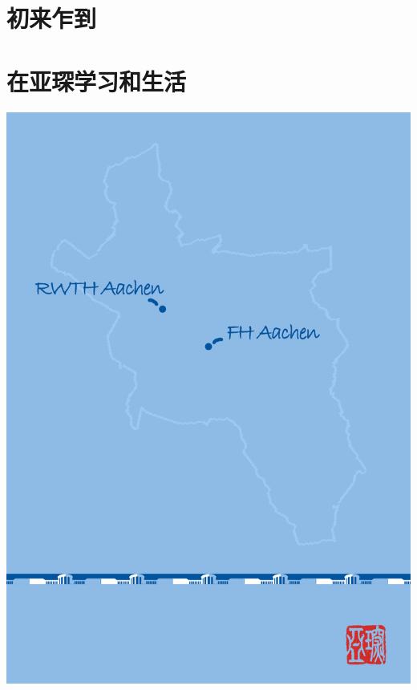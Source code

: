 \documentclass[a4paper,lang=cn,10pt,newtx,scheme=chinese]{elegantbook}
\begin{document}
\part{初来乍到}

%
%

%





\part{在亚琛学习和生活}



\nocite{*}

\appendix

\begin{titlepage}
\parindent=0pt
\includegraphics[width=\linewidth]{Bilder/Back_Cover_.jpg}
\end{titlepage}
\end{document}
